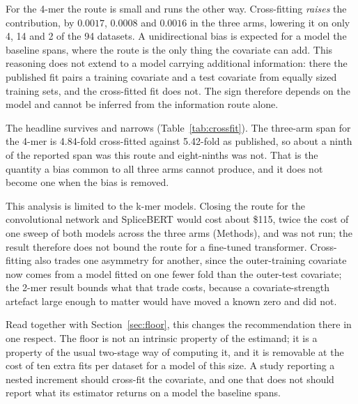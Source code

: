 For the 4-mer the route is small and runs the other way. Cross-fitting \emph{raises} the
contribution, by $0.0017$, $0.0008$ and $0.0016$ in the three arms, lowering it on only 4, 14
and 2 of the 94 datasets. A unidirectional bias is expected for a
model the baseline spans, where the route is the only thing the covariate can add. This reasoning
does not extend to a model carrying additional information: there the published fit pairs a training covariate and a test
covariate from equally sized training sets, and the cross-fitted fit does not. The
sign therefore depends on the model and cannot be inferred from the information route alone.

The headline survives and narrows (Table~\ref{tab:crossfit}). The three-arm span for the 4-mer
is 4.84-fold cross-fitted
against 5.42-fold as published, so about a ninth of the reported span was this route and
eight-ninths was not. That is the quantity a bias common to all three arms cannot produce, and
it does not become one when the bias is removed.

This analysis is limited to the k-mer models. Closing the route for the convolutional network and
SpliceBERT would cost about \$115, twice the cost of one sweep of both models across the three arms (Methods), and was not run; the result therefore does not bound the
route for a fine-tuned transformer. Cross-fitting also trades one asymmetry for another, since
the outer-training covariate now comes from a model fitted on one fewer fold than the
outer-test covariate; the 2-mer result bounds what that trade costs, because a covariate-strength
artefact large enough to matter would have moved a known zero and did not.

Read together with Section~\ref{sec:floor}, this changes the recommendation there in one
respect. The floor is not an intrinsic property of the estimand; it is a property of the usual
two-stage way of computing it, and it is removable at the cost of ten extra fits per dataset for
a model of this size. A study reporting a nested increment should cross-fit the covariate, and
one that does not should report what its estimator returns on a model the baseline spans.

